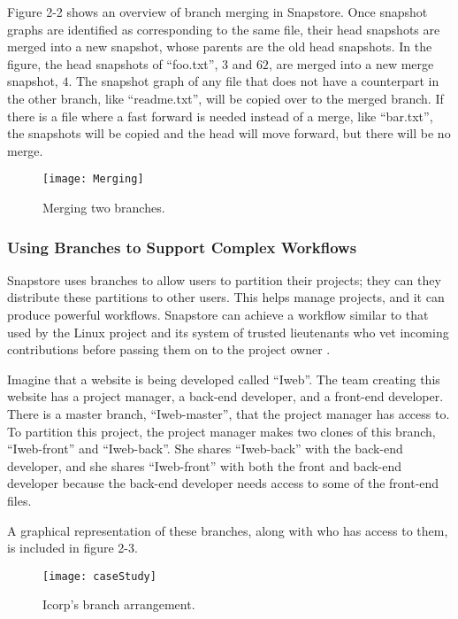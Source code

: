 Figure 2-2 shows an overview of branch merging in Snapstore. Once snapshot graphs are identified as corresponding to the same file, their head snapshots are merged into a new snapshot, whose parents are the old head snapshots. In the figure, the head snapshots of ``foo.txt'', $3$ and $62$, are merged into a new merge snapshot, $4$. The snapshot graph of any file that does not have a counterpart in the other branch, like ``readme.txt'', will be copied over to the merged branch. If there is a file where a fast forward is needed instead of a merge, like ``bar.txt'', the snapshots will be copied and the head will move forward, but there will be no merge. 

\begin{figure}
\texttt{[image: Merging]}
\caption{Merging two branches.}
\label{arm:fig1}
\end{figure}

\subsubsection{Using Branches to Support Complex Workflows}

Snapstore uses branches to allow users to partition their projects; they can they distribute these partitions to other users. This helps manage projects, and it can produce powerful workflows. Snapstore can achieve a workflow similar to that used by the Linux project and its system of trusted lieutenants who vet incoming contributions before passing them on to the project owner \cite{linux}.

Imagine that a website is being developed called ``Iweb''. The team creating this website has a project manager, a back-end developer, and a front-end developer. There is a master branch, ``Iweb-master'', that the project manager has access to. To partition this project, the project manager makes two clones of this branch, ``Iweb-front'' and ``Iweb-back''. She shares ``Iweb-back'' with the back-end developer, and she shares ``Iweb-front'' with both the front and back-end developer because the back-end developer needs access to some of the front-end files.

A graphical representation of these branches, along with who has access to them, is included in figure 2-3.

\begin{figure}
\texttt{[image: caseStudy]}
\caption{Icorp's branch arrangement.}
\label{arm:fig1}
\end{figure}

